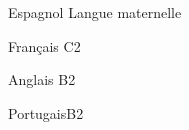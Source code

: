 \begin{skilllist}

\begin{languagelist}
	\item{Espagnol} {Langue maternelle}	
	\item{Français} {C2}	
	\item{Anglais}  {B2}	
	\item{Portugais}{B2}
\end{languagelist}





\end{skilllist}



